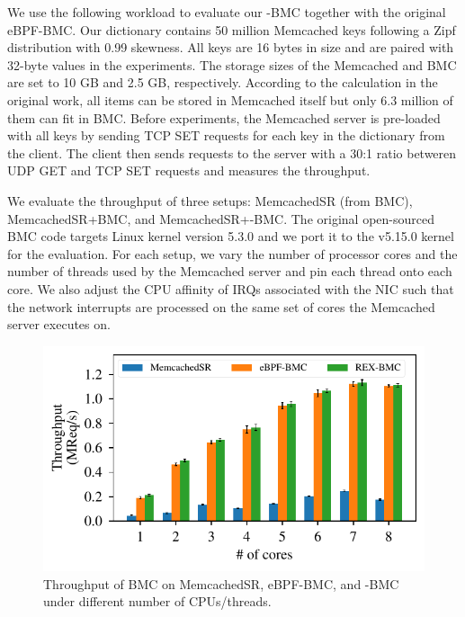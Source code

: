 
We use the following workload to evaluate our \projname{}-BMC together with the
    original eBPF-BMC.
Our dictionary contains 50 million Memcached keys following a Zipf
    distribution with 0.99 skewness.
All keys are 16 bytes in size and are paired with 32-byte values in the
    experiments.
The storage sizes of the Memcached and BMC are set to 10 GB and 2.5 GB,
    respectively.
According to the calculation in the original work, all items
    can be stored in Memcached itself but only 6.3 million of them can fit in
    BMC.
Before experiments, the Memcached server is pre-loaded with all keys by
    sending TCP SET requests for each key in the dictionary from the client.
The client then sends requests to the server with a 30:1 ratio betweren UDP GET and
    TCP SET requests and measures the throughput.

We evaluate the throughput of three setups: MemcachedSR (from BMC),
    MemcachedSR+BMC, and MemcachedSR+\projname{}-BMC.
The original open-sourced BMC code targets Linux kernel version 5.3.0 and we
    port it to the v5.15.0 \projname{} kernel for the evaluation.
For each setup, we vary the number of processor cores and the number of threads
    used by the Memcached server and pin each thread onto each core.
We also adjust the CPU affinity of IRQs associated with the NIC such that the
    network interrupts are processed on the same set of cores the Memcached
    server executes on.

\begin{figure}
    \includegraphics[width=1.0\linewidth]{figs/bmc.pdf}
    \centering
    \vspace{-25pt}
    \caption{Throughput of BMC on MemcachedSR, eBPF-BMC, and \projname{}-BMC
        under different number of CPUs/threads.
    }
    \label{fig:eval-bmc}
    \vspace{-10pt}
\end{figure}

